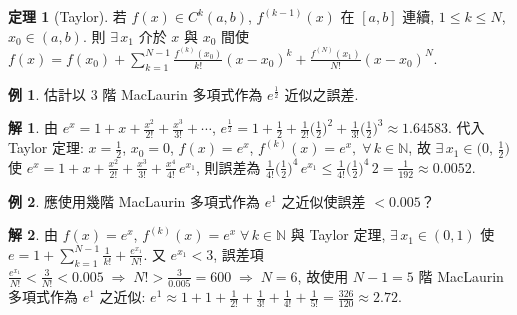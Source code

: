 \documentclass[12pt]{extarticle}
\newcommand{\ds}{\displaystyle}
\newcommand{\ie}{\;\Longrightarrow\;}
\newcommand{\vaa}{\symbfup{\alpha}}
\theoremstyle{definition}
\newtheorem*{thm}{定理}
\newtheorem*{ex}{例}
\newtheorem*{sol}{解}
\newtheorem*{prf}{證}
\newcommand{\vx}{\mathbf{x}}
\newcommand{\vh}{\mathbf{h}}
\begin{document}

\begin{thm}[Taylor]
  若 $f(x)\in C^k(a, b)$, $f^{(k - 1)}(x)$ 在 $[a, b]$ 連續, $1\leqslant k\leqslant N$, $x_0\in(a, b)$. 則 $\exists\,x_1$ 介於 $x$ 與 $x_0$ 間使 $\ds f(x) = f(x_0) + \sum_{k = 1}^{N - 1}\frac{f^{(k)}(x_0)}{k!}(x - x_0)^k + \frac{f^{(N)}(x_1)}{N!}(x - x_0)^N$.   
\end{thm}


\begin{ex}
  估計以 $3$ 階 MacLaurin 多項式作為 $\ds e^{\frac{1}{2}}$ 近似之誤差. 
\end{ex}

\begin{sol}
  由 $\ds e^x = 1 + x + \frac{x^2}{2!} + \frac{x^3}{3!} + \cdots$, $\ds e^{\frac{1}{2}} = 1 + \frac{1}{2} + \frac{1}{2!}\Big(\frac{1}{2}\Big)^2 + \frac{1}{3!}\Big(\frac{1}{2}\Big)^3\approx 1.64583$. 代入 Taylor 定理: $\ds x = \frac{1}{2}$, $x_0 = 0$, $f(x) = e^x$, $\ds f^{(k)}(x) = e^x,\;\forall\,k\in\mathbb{N}$, 故 $\ds\exists\,x_1\in\Big(0,\,\frac{1}{2}\Big)$ 使 $\ds e^x = 1 + x + \frac{x^2}{2!} + \frac{x^3}{3!} + \frac{x^4}{4!}\,e^{x_1}$, 則誤差為 $\ds\frac{1}{4!}\Big(\frac{1}{2}\Big)^4\,e^{x_1} \leqslant \frac{1}{4!}\Big(\frac{1}{2}\Big)^4\,2 = \frac{1}{192}\approx 0.0052$. 
\end{sol}

\begin{ex}
  應使用幾階 MacLaurin 多項式作為 $\ds e^1$ 之近似使誤差 $ < 0.005$？
\end{ex}

\begin{sol}
  由 $f(x) = e^x$, $\ds f^{(k)}(x) = e^x\;\forall\,k\in\mathbb{N}$ 與 Taylor 定理, $\exists\,x_1\in(0, 1)$ 使 $\ds e = 1 + \sum_{k = 1}^{N - 1}\frac{1}{k!} + \frac{e^{x_1}}{N!}$. 又 $e^{x_1} < 3$, 誤差項 $\ds\frac{e^{x_1}}{N!} < \frac{3}{N!} < 0.005\ie N! > \frac{3}{0.005} = 600 \ie N = 6$, 故使用 $N - 1 = 5$ 階 MacLaurin 多項式作為 $\ds e^1$ 之近似: $\ds e^1 \approx 1 + 1 + \frac{1}{2!} + \frac{1}{3!} + \frac{1}{4!} + \frac{1}{5!} = \frac{326}{120} \approx 2.72$.  
\end{sol}
\end{document}
